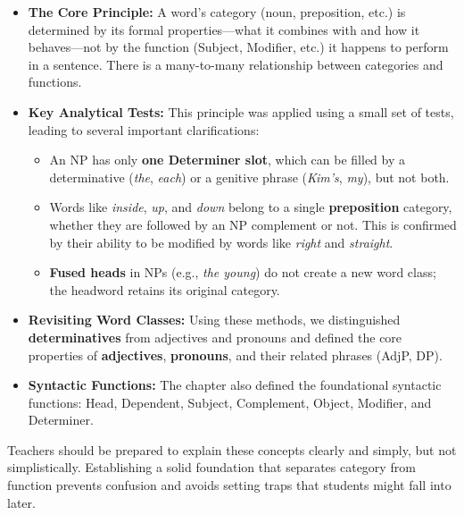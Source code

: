 \begin{itemize}[noitemsep]
    \item \textbf{The Core Principle:} A word's category (noun, preposition, etc.) is determined by its formal properties---what it combines with and how it behaves---not by the function (Subject, Modifier, etc.) it happens to perform in a sentence. There is a many-to-many relationship between categories and functions.

    \item \textbf{Key Analytical Tests:} This principle was applied using a small set of tests, leading to several important clarifications:
    \begin{itemize}[noitemsep]
        \item An NP has only \textbf{one Determiner slot}, which can be filled by a determinative (\textit{the}, \textit{each}) or a genitive phrase (\textit{Kim's}, \textit{my}), but not both.
        \item Words like \textit{inside}, \textit{up}, and \textit{down} belong to a single \textbf{preposition} category, whether they are followed by an NP complement or not. This is confirmed by their ability to be modified by words like \textit{right} and \textit{straight}.
        \item \textbf{Fused heads} in NPs (e.g., \textit{the young}) do not create a new word class; the headword retains its original category.
    \end{itemize}

    \item \textbf{Revisiting Word Classes:} Using these methods, we distinguished \textbf{determinatives} from adjectives and pronouns and defined the core properties of \textbf{adjectives}, \textbf{pronouns}, and their related phrases (AdjP, DP).

    \item \textbf{Syntactic Functions:} The chapter also defined the foundational syntactic functions: Head, Dependent, Subject, Complement, Object, Modifier, and Determiner.
\end{itemize}

Teachers should be prepared to explain these concepts clearly and simply, but not simplistically. Establishing a solid foundation that separates category from function prevents confusion and avoids setting traps that students might fall into later.